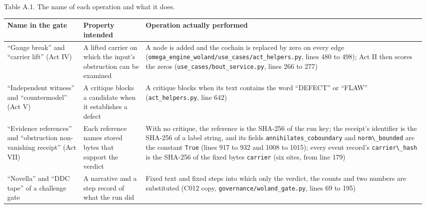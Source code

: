\documentclass[
  11pt,
]{article}
\newcommand{\passthrough}[1]{#1}
\begin{document}
Table A.1. The name of each operation and what it does.

\begin{longtable}[]{@{}
  >{\raggedright\arraybackslash}p{}
  >{\raggedright\arraybackslash}p{}
  >{\raggedright\arraybackslash}p{}@{}}
\toprule\noalign{}
\begin{minipage}[b]{\linewidth}\raggedright
Name in the gate
\end{minipage} & \begin{minipage}[b]{\linewidth}\raggedright
Property intended
\end{minipage} & \begin{minipage}[b]{\linewidth}\raggedright
Operation actually performed
\end{minipage} \\
\midrule\noalign{}
\endhead
\bottomrule\noalign{}
\endlastfoot
``Gauge break'' and ``carrier lift'' (Act IV) & A lifted carrier on
which the input's obstruction can be examined & A node is added and the
cochain is replaced by zero on every edge
(\nolinkurl{omega_engine_woland/use_cases/act_helpers.py}, lines 480 to
498); Act II then scores the zeros
(\nolinkurl{use_cases/bout_service.py}, lines 266 to 277) \\
``Independent witness'' and ``countermodel'' (Act V) & A critique blocks
a candidate when it establishes a defect & A critique blocks when its
text contains the word ``DEFECT'' or ``FLAW''
(\nolinkurl{act_helpers.py}, line 642) \\
``Evidence references'' and ``obstruction non-vanishing receipt'' (Act
VII) & Each reference names stored bytes that support the verdict & With
no critique, the reference is the SHA-256 of the run key; the receipt's
identifier is the SHA-256 of a label string, and its fields
\nolinkurl{annihilates_coboundary} and
\passthrough{\lstinline!norm\_bounded!} are the constant
\passthrough{\lstinline!True!} (lines 917 to 932 and 1008 to 1015);
every event record's \passthrough{\lstinline!carrier\_hash!} is the
SHA-256 of the fixed bytes \passthrough{\lstinline!carrier!} (six sites,
from line 179) \\
``Novella'' and ``DDC tape'' of a challenge gate & A narrative and a
step record of what the run did & Fixed text and fixed steps into which
only the verdict, the counts and two numbers are substituted (C012 copy,
\nolinkurl{governance/woland_gate.py}, lines 69 to 195) \\
\end{longtable}
\end{document}

